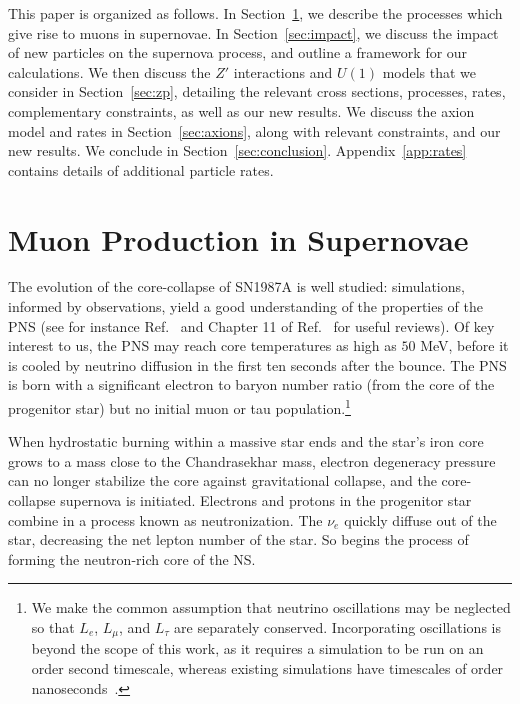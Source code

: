 \documentclass[11pt]{article}
\begin{document}
This paper is organized as follows. In Section~\ref{sec:muons}, we describe the processes which give rise to muons in supernovae. In Section~\ref{sec:impact}, we discuss the impact of new particles on the supernova process, and outline a framework for our calculations. We then discuss the $Z'$ interactions and $U(1)$ models that we consider in Section~\ref{sec:zp}, detailing the relevant cross sections, processes, rates, complementary constraints, as well as our new results. We discuss the axion model and rates in Section~\ref{sec:axions}, along with relevant constraints, and our new results. We conclude in Section~\ref{sec:conclusion}. Appendix~\ref{app:rates} contains details of additional particle rates.




\section{Muon Production in Supernovae}
\label{sec:muons}
The evolution of the core-collapse of SN1987A is well studied: simulations, informed by observations, yield a good understanding of the properties of the PNS (see for instance Ref.~\cite{Janka:2006fh, Burrows:2018qjy} and  Chapter 11 of Ref.~\cite{Raffelt:1996wa} for useful reviews). Of key interest to us, the PNS may reach core temperatures as high as $50$ MeV, before it is cooled by neutrino diffusion in the first ten seconds after the bounce. The PNS is born with a significant electron to baryon number ratio (from the core of the progenitor star) but no initial muon or tau population.\footnote{\footnotesize{We make the common assumption that neutrino oscillations may be neglected \cite{Bollig:2017lki} so that $L_e$, $L_\mu$, and $L_\tau$ are separately conserved. Incorporating oscillations is beyond the scope of this work, as it requires a simulation to be run on an order second timescale, whereas existing simulations have timescales of order nanoseconds~\cite{Capozzi:2020kge,Johns:2019izj}.}}

When hydrostatic burning within a massive star ends and the star's iron core grows to a mass close to the Chandrasekhar mass, electron degeneracy pressure can no longer stabilize the core against gravitational collapse, and the core-collapse supernova is initiated. Electrons and protons in the progenitor star combine in a process known as neutronization. The $\nu_e$ quickly diffuse out of the star, decreasing the net lepton number of the star. So begins the process of forming the neutron-rich core of the NS.
\end{document}
